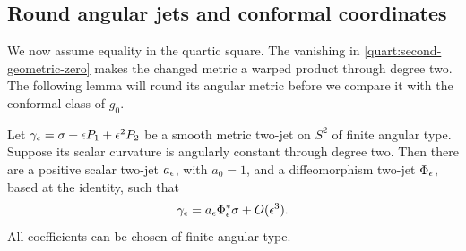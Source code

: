 \subsection{Round angular jets and conformal coordinates}
\label{quart:round-section}

We now assume equality in the quartic square. The vanishing in
\eqref{quart:second-geometric-zero} makes the changed metric a warped
product through degree two. The following lemma will round its angular
metric before we compare it with the conformal class of \(g_0\).

\begin{lemma}
\label{lem:round-jet}
Let
\(\gamma_\epsilon=\sigma+\epsilon P_1+\epsilon^2P_2\) be a smooth metric
two-jet on \(S^2\) of finite angular type.  Suppose its scalar
curvature is angularly constant through degree two.  Then there are
a positive scalar two-jet \(a_\epsilon\), with \(a_0=1\), and a
diffeomorphism two-jet \(\Phi_\epsilon\), based at the identity, such that
\[
 \gamma_\epsilon=a_\epsilon\Phi_\epsilon^*\sigma+O(\epsilon^3).
\]
All coefficients can be chosen of finite angular type.
\end{lemma}

